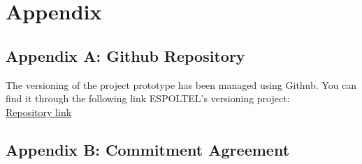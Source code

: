 \documentclass{scrreprt}
\begin{document}
\chapter{Appendix}

\section{Appendix A: Github Repository}
The versioning of the project prototype has been managed using Github. You can find it through the following link ESPOLTEL's versioning project:\\ \href{https://github.com/Jeremy-Poveda/EspoltelHiringManager}{Repository link}
\section{Appendix B: Commitment Agreement}
 
\FloatBarrier 
\end{document}
